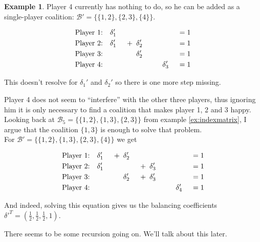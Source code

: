 \documentclass[10pt,a4paper,titlepage]{article}
\theoremstyle{plain}
\theoremstyle{definition}
\newtheorem{example}[thm]{Example} %
\begin{document}
\begin{example}
    Player 4 currently has nothing to do, so he can be added as a single-player coalition: $\mathcal{B}' = \{\{1, 2\}, \{2, 3\}, \{4\}\}$.\vspace{-15pt}

    \begin{alignat*}{8}
        \text{Player 1:} \quad & \delta_1' & & & & &\enskip = 1\\
        \text{Player 2:} \quad & \delta_1' &\enskip + \enskip &\delta_2' & & &\enskip = 1\\
        \text{Player 3:} \quad & & & \delta_2' & & & \enskip = 1\\
        \text{Player 4:} \quad & & & &\hphantom{\enskip + \enskip} & \delta_3' & \enskip = 1
    \end{alignat*}

    This doesn't resolve for $\delta_1'$ and $\delta_2'$ so there is one more step missing.
    
    Player 4 does not seem to \enquote{interfere} with the other three players, thus ignoring him it is only necessary to find a coalition that makes player 1, 2 and 3 happy. Looking back at $\mathcal{B}_5 = \{\{1, 2\}, \{1, 3\}, \{2, 3\}\}$ from example \ref{ex:indexmatrix}, I argue that the coalition $\{1, 3\}$ is enough to solve that problem.\\For $\mathcal{B}' = \{\{1, 2\}, \{1, 3\}, \{2, 3\}, \{4\}\}$ we get\vspace{-15pt}

    \begin{alignat*}{8}
        \text{Player 1:} \quad & \delta_1' & \enskip + \enskip & \delta_2' & & & & & \enskip = 1\\
        \text{Player 2:} \quad & \delta_1' & & & \enskip + \enskip & \delta_3' & & & \enskip = 1\\
        \text{Player 3:} \quad & & & \delta_2' & \enskip + \enskip & \delta_3' & & & \enskip = 1\\
        \text{Player 4:} \quad & & & & & & \hphantom{\enskip + \enskip} & \delta_4' & \enskip = 1
    \end{alignat*}

    And indeed, solving this equation gives us the balancing coefficients\\$\delta'^T = (\frac{1}{2}, \frac{1}{2}, \frac{1}{2}, 1)$.\\
\end{example}

There seems to be some recursion going on. We'll talk about this later.
\end{document}
